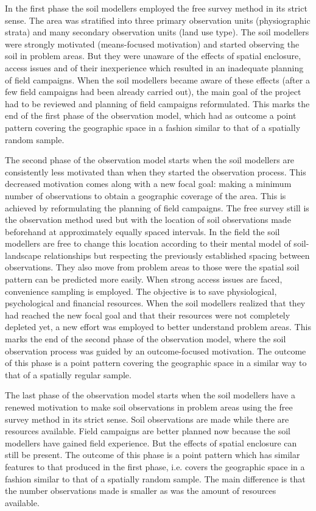 In the first phase the soil modellers employed the free survey method in its strict sense. The area was 
stratified into three primary observation units (physiographic strata) and many secondary observation units 
(land use type). The soil modellers were strongly motivated (means-focused motivation) and started observing 
the soil in problem areas. But they were unaware of the effects of spatial enclosure, access issues and of 
their inexperience which resulted in an inadequate planning of field campaigns. When the soil modellers became
aware of these effects (after a few field campaigns had been already carried out), the main goal of the 
project had to be reviewed and planning of field campaigns reformulated. This marks the end of the first phase 
of the observation model, which had as outcome a point pattern covering the geographic space in a fashion 
similar to that of a spatially random sample.

The second phase of the observation model starts when the soil modellers are consistently less motivated than 
when they started the observation process. This decreased motivation comes along with a new focal goal: making 
a minimum number of observations to obtain a  geographic coverage of the area. This is achieved 
by reformulating the planning of field campaigns. The free survey still is the observation method used but 
with the location of soil observations made beforehand at approximately equally spaced intervals. In the field 
the soil modellers are free to change this location according to their mental model of soil-landscape 
relationships but respecting the previously established spacing between observations. They also move from 
problem areas to those were the spatial soil pattern can be predicted more easily. When strong access issues 
are faced, convenience sampling is employed. The objective is to save physiological, psychological and 
financial resources. When the soil modellers realized that they had reached the new focal goal and that their
resources were not completely depleted yet, a new effort was employed to better understand problem areas. This 
marks the end of the second phase of the observation model, where the soil observation process was guided by an
outcome-focused motivation. The outcome of this phase is a point pattern covering the geographic space in a 
similar way to that of a spatially regular sample.

The last phase of the observation model starts when the soil modellers have a renewed motivation to make soil 
observations in problem areas using the free survey method in its strict sense. Soil observations are made 
while there are resources available. Field campaigns are better planned now because the soil modellers have 
gained field experience. But the effects of spatial enclosure can still be present. The outcome of 
this phase is a point pattern which has similar features to that produced in the first phase, i.e. covers the 
geographic space in a fashion similar to that of a spatially random sample. The main difference is that the 
number observations made is smaller as was the amount of resources available.

